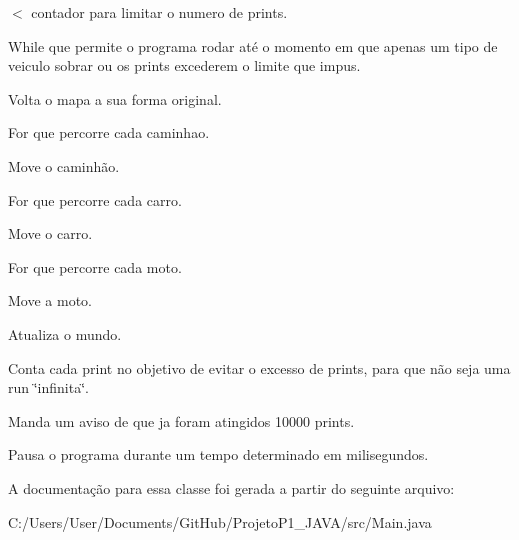 $<$ contador para limitar o numero de prints.

While que permite o programa rodar até o momento em que apenas um tipo de veiculo sobrar ou os prints excederem o limite que impus.

Volta o mapa a sua forma original.

For que percorre cada caminhao.

Move o caminhão.

For que percorre cada carro.

Move o carro.

For que percorre cada moto.

Move a moto.

Atualiza o mundo.

Conta cada print no objetivo de evitar o excesso de prints, para que não seja uma run \char`\"{}infinita\char`\"{}.

Manda um aviso de que ja foram atingidos 10000 prints.

Pausa o programa durante um tempo determinado em milisegundos.

A documentação para essa classe foi gerada a partir do seguinte arquivo\+:\begin{DoxyCompactItemize}
\item 
C\+:/\+Users/\+User/\+Documents/\+Git\+Hub/\+Projeto\+P1\+\_\+\+J\+A\+V\+A/src/Main.\+java\end{DoxyCompactItemize}
